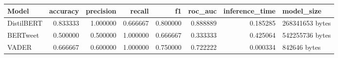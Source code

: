 \begin{tabular}{lrrrrrrl}
\toprule
Model & accuracy & precision & recall & f1 & roc_auc & inference_time & model_size \\
\midrule
DistilBERT & 0.833333 & 1.000000 & 0.666667 & 0.800000 & 0.888889 & 0.185285 & 268341653 bytes \\
BERTweet & 0.500000 & 0.500000 & 1.000000 & 0.666667 & 0.333333 & 0.425064 & 542255736 bytes \\
VADER & 0.666667 & 0.600000 & 1.000000 & 0.750000 & 0.722222 & 0.000334 & 842646 bytes \\
\bottomrule
\end{tabular}
